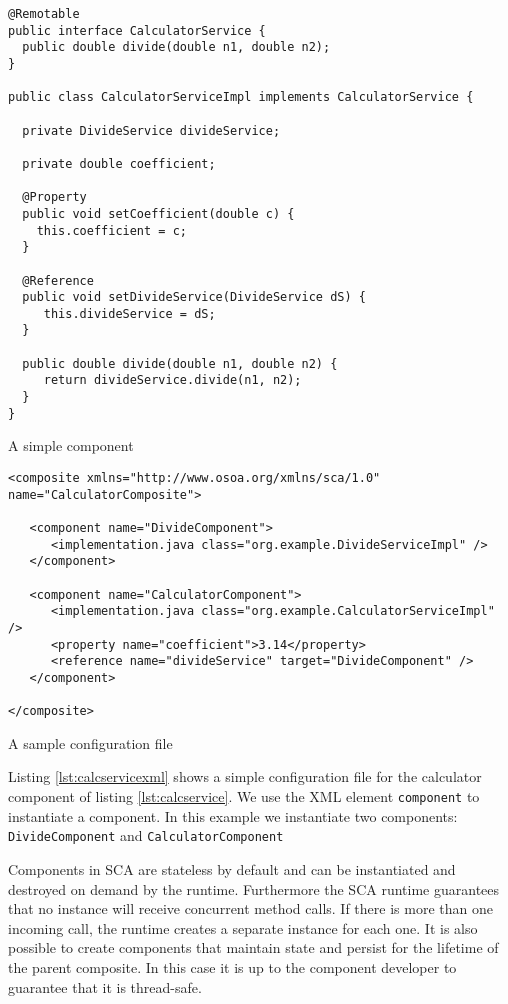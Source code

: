\begin{listing}
\begin{verbatim}
@Remotable
public interface CalculatorService {
  public double divide(double n1, double n2);
}

public class CalculatorServiceImpl implements CalculatorService {

  private DivideService divideService;
  
  private double coefficient;
  
  @Property
  public void setCoefficient(double c) {
    this.coefficient = c;
  }

  @Reference
  public void setDivideService(DivideService dS) {
     this.divideService = dS;
  }

  public double divide(double n1, double n2) {
     return divideService.divide(n1, n2);
  }
}
\end{verbatim}
\caption{A simple component}
\label{lst:calcservice}
\end{listing}
\begin{listing}
\begin{verbatim}
<composite xmlns="http://www.osoa.org/xmlns/sca/1.0" name="CalculatorComposite">

   <component name="DivideComponent">
      <implementation.java class="org.example.DivideServiceImpl" />
   </component>

   <component name="CalculatorComponent">
      <implementation.java class="org.example.CalculatorServiceImpl" />
      <property name="coefficient">3.14</property>
      <reference name="divideService" target="DivideComponent" />
   </component>

</composite>
\end{verbatim}
\caption{A sample configuration file}
\label{lst:calcservicexml}
\end{listing}

Listing \ref{lst:calcservicexml} shows a simple configuration file for the calculator component of listing \ref{lst:calcservice}.
We use the XML element \texttt{component} to instantiate a component. In this example we instantiate two components:
\texttt{DivideComponent} and \texttt{CalculatorComponent}

Components in SCA are stateless by default and can be instantiated and destroyed on demand by the runtime. Furthermore the
SCA runtime guarantees that no instance will receive concurrent method calls. If there is more than one incoming call, the
runtime creates a separate instance for each one. It is also possible to create components that maintain state and persist
for the lifetime of the parent composite. In this case it is up to the component developer to guarantee that it is thread-safe.

